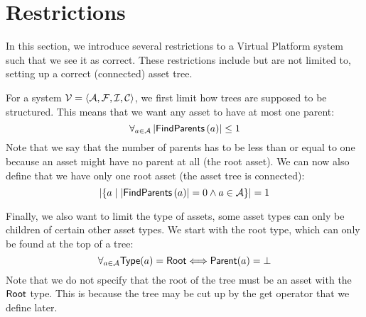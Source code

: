 \section{Restrictions}\label{sec:vp:restrictions}
In this section, we introduce several restrictions to a Virtual Platform
system such that we see it as correct. These restrictions include but are not
limited to, setting up a correct (connected) asset tree.

For a system \( \mathcal{V} = \left< \mathcal{A} , \mathcal{F} , 
\mathcal{I} , \mathcal{C} \right> \), we first limit how trees are
supposed to be structured. This means that we want any asset to have at most
one parent:
\[
  \forall_{a \in \mathcal{A}} \left| {\sf FindParents}\left( a \right) \right| \leq 1
\]
Note that we say that the number of parents has to be less than or equal to
one because an asset might have no parent at all (the root asset). We can now
also define that we have only one root asset (the asset tree is connected):
\[
  \left| \left\{ a \hspace*{1mm} \middle| \hspace*{1mm} \left| {\sf FindParents}\left( a \right) \right| = 0 \land a \in \mathcal{A} \right\} \right| = 1
\]

Finally, we also want to limit the type of assets, some asset types can only
be children of certain other asset types. We start with the root type, which
can only be found at the top of a tree:
\[
  \forall_{a \in \mathcal{A}} {\sf Type}(a) = {\sf Root} \Longleftrightarrow {\sf Parent}(a) = \bot
\]
Note that we do not specify that the root of the tree must be an asset with the
\( {\sf Root} \) type. This is because the tree may be cut up by the get
operator that we define later.

